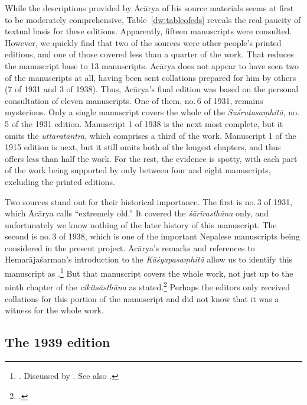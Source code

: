 While the descriptions provided by Ācārya of his source materials seems at first
to be moderately comprehensive, Table~\ref{dw:tableofeds} reveals the real paucity
of textual basis for these editions.  Apparently, fifteen manuscripts were
consulted.  However, we quickly find that two of the sources were other people's
printed editions, and one of those covered less than a quarter of the work.  That
reduces the manuscript base to 13 manuscripts.   Ācārya does not appear to have
seen two of the manuscripts at all, having been sent collations prepared for him
by others (7 of 1931 and 3 of 1938).  Thus, Ācārya's final edition was based on
the personal consultation of eleven manuscripts.   One of them, no.\,6 of 1931,
remains mysterious. Only a single manuscript covers the whole of the
\emph{Suśrutasaṃhitā}, no.\,5 of the 1931 edition.  Manuscript 1 of 1938 is the
next most complete, but it omits the \emph{uttaratantra}, which comprises a third
of the work.  Manuscript 1 of the 1915 edition is next, but it still omits both of
the longest chapters, and thus offers less than half the work.  For the rest, the
evidence is spotty, with each part of the work being supported by only between
four and eight manuscripts, excluding the printed editions.

Two sources stand out for their historical importance.  The first is no.\,3 of
1931, which Ācārya calls “extremely old.”  It covered the \emph{śārīrasthāna}
only, and unfortunately we know nothing of the later history of this manuscript.
The second is no.\,3 of 1938, which is one of the important Nepalese manuscripts
being considered in the present project. Ācārya's remarks and references to
Hemarājaśarman's introduction to the \emph{Kāśyapasaṃhitā} allow us
to identify this manuscript as .\footnote{\cites[22]{susr-trikamji3}[56--57]{hema-1938}. Discussed by
\citet[\S 1.1, 2.3]{kleb-2021b}.  See also \cites[IIB, 
25--41]{meul-hist}[161--169]{wuja-2003}.} But 
that manuscript covers the whole work, not
just up to the ninth chapter of the \emph{cikitsāsthāna} as
\citeauthor{susr-trikamji3} stated.\footcite[22]{susr-trikamji3}  Perhaps the editors
only received collations for this portion of the manuscript and did not know that it
was a witness for the whole work.

\subsection{The 1939 edition}        

